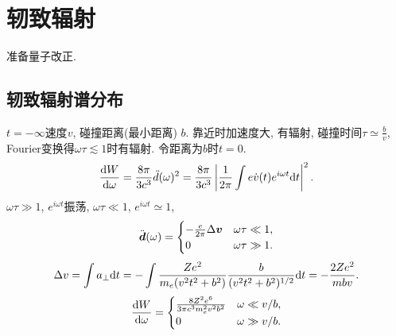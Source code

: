 \chapter{轫致辐射}

准备量子改正.

\section{轫致辐射谱分布}

$t=-\infty$速度$v$, 碰撞距离(最小距离) $b$. 靠近时加速度大, 有辐射, 碰撞时间$\tau\simeq\frac{b}{v}$, Fourier变换得$\omega\tau\lesssim1$时有辐射. 令距离为$b$时$t=0$.
\begin{equation}
    \frac{\mathrm{d} W}{\mathrm{d}\omega}=\frac{8\pi}{3c^3}\ddot{d}(\omega)^2=\frac{8\pi}{3c^3}\left\lvert\frac{1}{2\pi}\int e\dot{v}(t)e^{i\omega t}\mathrm{d} t\right\rvert^2.
\end{equation}
$\omega\tau\gg 1$, $e^{i\omega t}$振荡, $\omega\tau\ll 1$, $e^{i\omega t}\simeq1$, 
\begin{equation}
    \ddot{\boldsymbol{d}}(\omega)=\begin{cases}
        -\frac{e}{2\pi}\Delta\boldsymbol{v}&\omega\tau\ll1,\\
        0&\omega\tau\gg1.
    \end{cases}
\end{equation}
\begin{equation}
    \Delta v=\int a_\perp \mathrm{d} t=-\int \frac{Ze^2}{m_e(v^2t^2+b^2)}\frac{b}{(v^2t^2+b^2)^{1/2}} \mathrm{d} t=-\frac{2Ze^2}{mbv}.
\end{equation}
\begin{equation}
    \frac{\mathrm{d} W}{\mathrm{d}\omega}=\begin{cases}
        \frac{8Z^2e^6}{3\pi c^3m_e^2v^2b^2}&\omega\ll v/b,\\
        0&\omega\gg v/b.
    \end{cases}
\end{equation}

